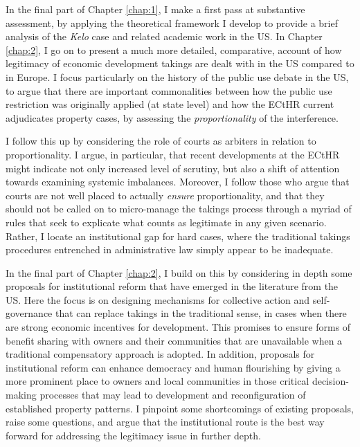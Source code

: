 {In the final part of Chapter \ref{chap:1}, I make a first pass at substantive assessment, by applying the theoretical framework I develop to provide a brief analysis of the {\it Kelo} case and related academic work in the US. In Chapter \ref{chap:2}, I go on to present a much more detailed, comparative, account of how legitimacy of economic development takings are dealt with in the US compared to in Europe. I focus particularly on the history of the public use debate in the US, to argue that there are important commonalities between how the public use restriction was originally applied (at state level) and how the ECtHR current adjudicates property cases, by assessing the {\it proportionality} of the interference.

I follow this up by considering the role of courts as arbiters in relation to proportionality. I argue, in particular, that recent developments at the ECtHR might indicate not only increased level of scrutiny, but also a shift of attention towards examining systemic imbalances. Moreover, I follow those who argue that courts are not well placed to actually {\it ensure} proportionality, and that they should not be called on to micro-manage the takings process through a myriad of rules that seek to explicate what counts as legitimate in any given scenario. Rather, I locate an institutional gap for hard cases, where the traditional takings procedures entrenched in administrative law simply appear to be inadequate.

In the final part of Chapter \ref{chap:2}, I build on this by considering in depth some proposals for institutional reform that have emerged in the literature from the US. Here the focus is on designing mechanisms for collective action and self-governance that can replace takings in the traditional sense, in cases when there are strong economic incentives for development. This promises to ensure forms of benefit sharing with owners and their communities that are unavailable when a traditional compensatory approach is adopted. In addition, proposals for institutional reform can enhance democracy and human flourishing by giving a more prominent place to owners and local communities in those critical decision-making processes that may lead to development and reconfiguration of established property patterns. I pinpoint some shortcomings of existing proposals, raise some questions, and argue that the institutional route is the best way forward for addressing the legitimacy issue in further depth.

}
